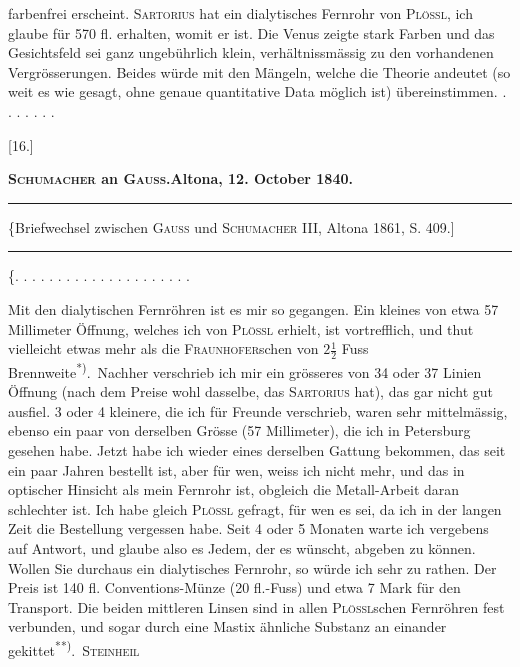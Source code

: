 \par\clearpage{}
\noindent farbenfrei erscheint. \textsc{Sartorius} hat ein dialytisches Fernrohr von \textsc{Plössl}, ich glaube für 570 fl. erhalten, womit er  ist. Die Venus zeigte stark Farben und das Gesichtsfeld sei ganz ungebührlich klein, verhältnissmässig zu den vorhandenen Vergrösserungen. Beides würde mit den Mängeln, welche die Theorie andeutet (so weit es wie gesagt, ohne genaue quantitative Data möglich ist) übereinstimmen. . . . . . . .
\begin{center}
[16.]\par\medskip
\textbf{\textsc{Schumacher} an \textsc{Gauss}.\quad Altona, 12. October 1840.}\par\medskip
\rule{.80\linewidth}{.4pt}\par\smallskip
{\footnotesize \{Briefwechsel zwischen \textsc{Gauss} und \textsc{Schumacher} III, Altona 1861, S. 409.]}\par\smallskip
\rule{.80\linewidth}{.4pt}
\end{center}
\noindent \{. . . . . . . . . . . . . . . . . . . . .\par
\noindent\hspace*{\parindent}Mit den dialytischen Fernröhren ist es mir so gegangen. Ein kleines von etwa 57 Millimeter Öffnung, welches ich von \textsc{Plössl} erhielt, ist vortrefflich, und thut vielleicht etwas mehr als die \textsc{Fraunhofer}schen von $2\frac{1}{2}$ Fuss Brennweite\textsuperscript{*)}.\begingroup\renewcommand{\thefootnote}{}\endgroup\ Nachher verschrieb ich mir ein grösseres von 34 oder 37 Linien Öffnung (nach dem Preise wohl dasselbe, das \textsc{Sartorius} hat), das gar nicht gut ausfiel. 3 oder 4 kleinere, die ich für Freunde verschrieb, waren sehr mittelmässig, ebenso ein paar von derselben Grösse (57 Millimeter), die ich in Petersburg gesehen habe. Jetzt habe ich wieder eines derselben Gattung bekommen, das seit ein paar Jahren bestellt ist, aber für wen, weiss ich nicht mehr, und das in optischer Hinsicht  als mein Fernrohr ist, obgleich die Metall-Arbeit daran schlechter ist. Ich habe gleich \textsc{Plössl} gefragt, für wen es sei, da ich in der langen Zeit die Bestellung vergessen habe. Seit 4 oder 5 Monaten warte ich vergebens auf Antwort, und glaube also es Jedem, der es wünscht, abgeben zu können. Wollen Sie durchaus ein dialytisches Fernrohr, so würde ich sehr zu  rathen. Der Preis ist 140 fl. Conventions-Münze (20 fl.-Fuss) und etwa 7 Mark für den Transport. Die beiden mittleren Linsen sind in allen \textsc{Plössl}schen Fernröhren fest verbunden, und sogar durch eine Mastix ähnliche Substanz an einander gekittet\textsuperscript{**)}.\begingroup\renewcommand{\thefootnote}{}\endgroup\ \textsc{Steinheil}
